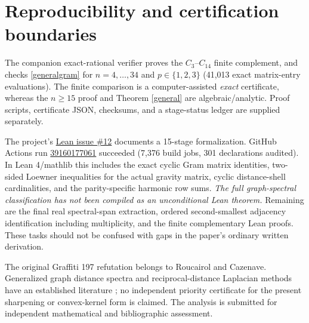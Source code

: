 \documentclass[10pt,twocolumn]{article}
\begin{document}
\section{Reproducibility and certification boundaries}
The companion exact-rational verifier proves the $C_3$--$C_{14}$ finite complement, and checks \eqref{generalgram} for $n=4,\ldots,34$ and $p\in\{1,2,3\}$ (41,013 exact matrix-entry evaluations). The finite comparison is a computer-assisted \emph{exact} certificate, whereas the $n\ge15$ proof and Theorem \ref{general} are algebraic/analytic. Proof scripts, certificate JSON, checksums, and a stage-status ledger are supplied separately.

The project's \href{https://github.com/tonynewton79-web/newton-400-conjectures/issues/12}{Lean issue \#12} documents a 15-stage formalization. GitHub Actions run \href{https://github.com/tonynewton79-web/newton-400-conjectures/actions/runs/39160177061}{39160177061} succeeded (7,376 build jobs, 301 declarations audited). In Lean 4/mathlib this includes the exact cyclic Gram matrix identities, two-sided Loewner inequalities for the actual gravity matrix, cyclic distance-shell cardinalities, and the parity-specific harmonic row sums. \emph{The full graph-spectral classification has not been compiled as an unconditional Lean theorem.} Remaining are the final real spectral-span extraction, ordered second-smallest adjacency identification including multiplicity, and the finite complementary Lean proofs. These tasks should not be confused with gaps in the paper's ordinary written derivation.

The original Graffiti 197 refutation belongs to Roucairol and Cazenave. Generalized graph distance spectra and reciprocal-distance Laplacian methods have an established literature \cite{DeVille2022,HararyLaplacian2022}; no independent priority certificate for the present sharpening or convex-kernel form is claimed. The analysis is submitted for independent mathematical and bibliographic assessment.
\end{document}
